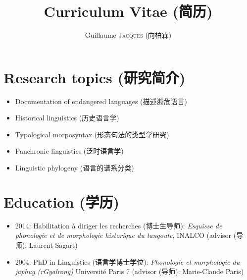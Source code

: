 \documentclass[oldfontcommands,oneside,a4paper,11pt]{article}
\newcommand{\zh}[1]{{\cn #1}}
\newcommand{\lingua}[3]{#2 (\zh{#3})}
\begin{document}
 \sloppy


\title{ \lingua{Curriculum Vitae}{Curriculum Vitae}{简历}}
\author{\lingua{Guillaume \textsc{Jacques}}{Guillaume \textsc{Jacques}}{向柏霖}}
\maketitle

\sloppy
\section*{\lingua{Centres d'intérêt}{Research topics}{研究简介} }
\begin{itemize}
\item \lingua{Documentation de langues en danger}{Documentation of endangered languages}{描述濒危语言} 
\item \lingua{Linguistique historique}{Historical linguistics}{历史语言学} 
\item \lingua{Typologie morphosyntaxique}{Typological morposyntax}{形态句法的类型学研究} 
\item \lingua{Linguistique panchronique}{Panchronic linguistics}{泛时语言学}
\item \lingua{Phylogénie linguistics}{Linguistic phylogeny}{语言的谱系分类}
\end{itemize}

\section*{\lingua{Cursus universitaire}{Education}{学历}}
\begin{itemize}
\item 2014: \lingua{Habilitation à diriger les recherches}{Habilitation à diriger les recherches}{博士生导师}: \textit{Esquisse de phonologie et de morphologie historique du tangoute}, INALCO  (\lingua{directeur}{advisor}{导师}: Laurent Sagart)
\item 2004: \lingua{Doctorat de linguistique}{PhD in Linguistics}{语言学博士学位}: \textit{Phonologie et morphologie du japhug (rGyalrong)} Université Paris 7 (\lingua{directeur}{advisor}{导师}: Marie-Claude Paris)
\end{itemize}
\end{document}
